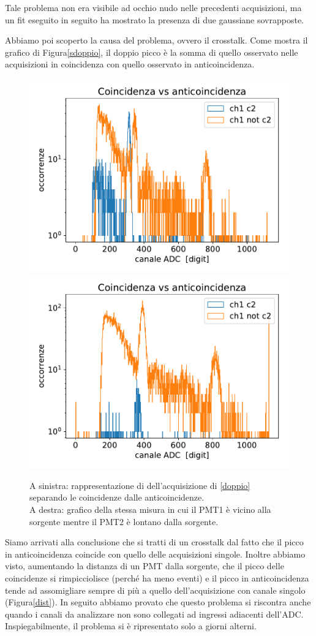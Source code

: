 Tale problema non era visibile ad occhio nudo nelle precedenti acquisizioni, ma un fit eseguito in seguito ha mostrato la presenza di due gaussiane sovrapposte.


Abbiamo poi scoperto la causa del problema, ovvero il crosstalk.
Come mostra il grafico di Figura\autoref{sdoppio}, il doppio picco è la somma di quello osservato nelle acquisizioni in coincidenza con quello osservato in anticoincidenza. 

\begin{figure}[h]
\centering
\subfloat
{
\includegraphics[width=18 em]{immagini/sdoppio}
\label{sdoppio}
}
\subfloat
{
\includegraphics[width=18 em]{immagini/dist}
\label{dist}
}

\caption{A sinistra: rappresentazione di dell'acquisizione di \autoref{doppio} separando le coincidenze dalle anticoincidenze. \\
A destra: grafico della stessa misura in cui il PMT1 è vicino alla sorgente mentre il PMT2 è lontano dalla sorgente.}

\end{figure}

Siamo arrivati alla conclusione che si tratti di un crosstalk dal fatto che il picco in anticoincidenza coincide con quello delle acquisizioni singole. Inoltre abbiamo visto, aumentando la distanza di un PMT dalla sorgente, che il picco delle coincidenze si rimpicciolisce (perché ha meno eventi) e il picco in anticoincidenza tende ad assomigliare sempre di più a quello dell'acquisizione con canale singolo (Figura\autoref{dist}).
In seguito abbiamo provato che questo problema si riscontra anche quando i canali da analizzare non sono collegati ad ingressi adiacenti dell'ADC. Inspiegabilmente, il problema si è ripresentato solo a giorni alterni. 

